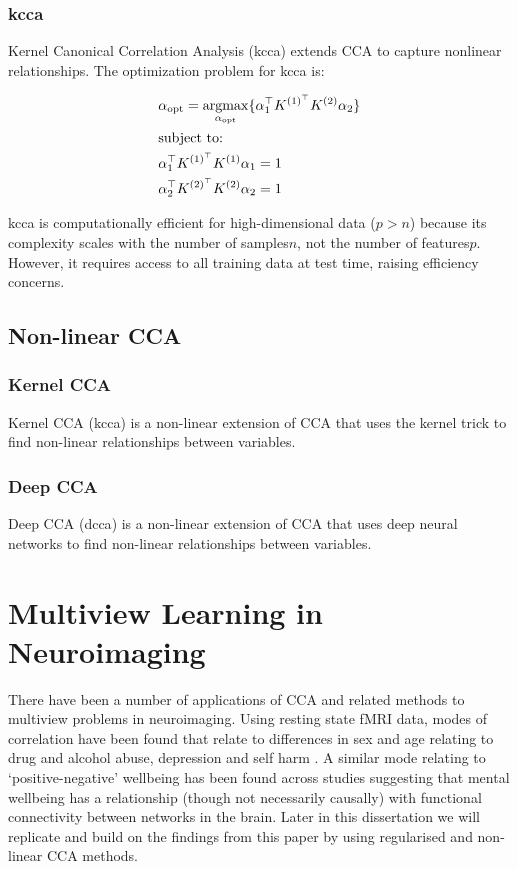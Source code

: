 \subsubsection{\acrshort{kcca}}

Kernel Canonical Correlation Analysis (\acrshort{kcca}) extends CCA to capture nonlinear relationships. 
The optimization problem for \acrshort{kcca} is:

\begin{align}
    & \alpha_{\text{opt}}=\underset{\alpha_{\text{opt}}}{\mathrm{argmax}}\{ \alpha_1^{\top}K^{(1)^{\top}}K^{(2)}\alpha_2  \}\\
    & \text{subject to:} \notag\\
    & \alpha_1^{\top}K^{(1)^{\top}}K^{(1)}\alpha_1=1 \notag\\
    & \alpha_2^{\top}K^{(2)^{\top}}K^{(2)}\alpha_2=1 \notag
\end{align}


\acrshort{kcca} is computationally efficient for high-dimensional data (\(p>n\)) because its complexity scales with the number of samples\(n\), not the number of features\(p\).
However, it requires access to all training data at test time, raising efficiency concerns.

\subsection{Non-linear CCA}

\subsubsection{Kernel CCA}

Kernel CCA (\acrshort{kcca}) is a non-linear extension of CCA that uses the kernel trick to find non-linear relationships between variables.

\subsubsection{Deep CCA}

Deep CCA (\acrshort{dcca}) is a non-linear extension of CCA that uses deep neural networks to find non-linear relationships between variables.

\section{Multiview Learning in Neuroimaging}

There have been a number of applications of CCA and related methods to multiview problems in neuroimaging.
Using resting state fMRI data, modes of correlation have been found that relate to differences in sex and age relating to drug and alcohol abuse, depression and self harm \citep{mihalik2019brain}.
A similar mode relating to `positive-negative' wellbeing has been found across studies \citep{smith2015positive}suggesting that mental wellbeing has a relationship (though not necessarily causally) with functional connectivity between networks in the brain.
Later in this dissertation we will replicate and build on the findings from this paper by using regularised and non-linear CCA methods.

